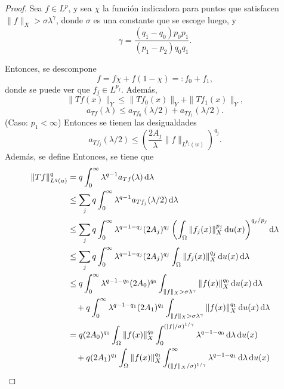 \begin{proof}
	Sea $f\in L^p$, y sea $\chi$ la función indicadora para puntos que satisfacen $\|f\|_X>\sigma\lambda^\gamma$, donde $\sigma$ es una constante que se escoge luego, y \begin{equation*}
		\gamma = \frac{(q_1-q_0)p_0p_1}{(p_1-p_2)q_0q_1}.
	\end{equation*}
	
	Entonces, se descompone
	\begin{equation*}
		f = f\chi + f(1-\chi) =: f_0 + f_1,
	\end{equation*}
	donde se puede ver que $f_j \in L^{p_j}$. Además, 
	\begin{equation*}
		\|Tf(x)\|_Y  \leq \|Tf_0(x)\|_Y +\|Tf_1(x)\|_Y, 
	\end{equation*}
	\begin{equation*}
		a_{Tf}(\lambda) \leq a_{Tf_0}(\lambda/2) + a_{Tf_1}(\lambda/2).
	\end{equation*}
	(Caso: $p_1<\infty$)  Entonces se tienen las desigualdades 
	\begin{equation*}
		a_{Tf_j}(\lambda/2) \leq \left(\frac{2A_j}{\lambda}\|f\|_{L^{p_j}(w)}\right)^{q_j}.
	\end{equation*}
	Además, se define 
	Entonces, se tiene que 
	\begin{align*}
		\|Tf\|_{L^q(u)}^q & = q\int_0^\infty\lambda^{q-1}a_{Tf}(\lambda) \diff \lambda \\
		& \leq \sum_j q\int_0^\infty\lambda^{q-1}a_{Tf_j}(\lambda/2) \diff \lambda \\
		& \leq \sum_j q\int_0^\infty\lambda^{q-1-q_j} (2A_j)^{q_j}\left( \int_\Omega \|f_j(x)\|_X^{p_j}\diff u(x) \right)^{q_j/p_j}\diff \lambda\\ 
		& \leq \sum_j q\int_0^\infty\lambda^{q-1-q_j} (2A_j)^{q_j}\int_\Omega \|f_j(x)\|_X^{q_j}\diff u(x) \diff \lambda\\
		& \leq q\int_0^\infty\lambda^{q-1-q_0} (2A_0)^{q_0}\int_{\|f\|_X>\sigma\lambda^\gamma} \|f(x)\|_X^{q_0}\diff u(x) \diff \lambda\\
		& \quad + q\int_0^\infty\lambda^{q-1-q_1} (2A_1)^{q_1} \int_{\|f\|_X>\sigma\lambda^\gamma} \|f(x)\|_X^{q_1}\diff u(x) \diff \lambda\\
		& = q(2A_0)^{q_0} \int_\Omega \|f(x)\|_X^{q_0} \int_0^{(|f|/\sigma)^{1/\gamma}} \lambda^{q-1-q_0} \diff\lambda \diff u(x) \\
		& \quad + q(2A_1)^{q_1} \int_\Omega \|f(x)\|_X^{q_1} \int_{(\|f\|_X/\sigma)^{1/\gamma}}^{\infty} \lambda^{q-1-q_1} \diff\lambda \diff u(x) \\

\end{align*}
\end{proof}
